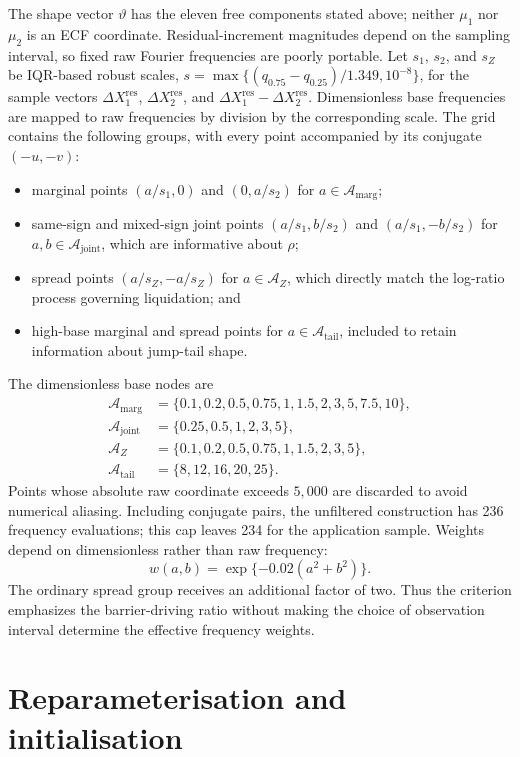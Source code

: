 \documentclass[11pt]{article}
\begin{document}
The shape vector $\vartheta$ has the eleven free components stated above; neither
$\mu_1$ nor $\mu_2$ is an ECF coordinate.
Residual-increment magnitudes depend on the sampling interval, so fixed raw Fourier frequencies
are poorly portable. Let $s_1$, $s_2$, and $s_Z$ be IQR-based robust scales,
$s=\max\{(q_{0.75}-q_{0.25})/1.349,10^{-8}\}$, for the sample vectors
$\Delta X_1^{\mathrm{res}}$, $\Delta X_2^{\mathrm{res}}$, and
$\Delta X_1^{\mathrm{res}}-\Delta X_2^{\mathrm{res}}$. Dimensionless base
frequencies are mapped to raw frequencies by division by the corresponding scale. The
grid contains the following groups, with every point accompanied by its conjugate
$(-u,-v)$:
\begin{itemize}
  \item marginal points $(a/s_1,0)$ and $(0,a/s_2)$ for
    $a\in\mathcal{A}_{\mathrm{marg}}$;
  \item same-sign and mixed-sign joint points
    $(a/s_1,b/s_2)$ and $(a/s_1,-b/s_2)$ for
    $a,b\in\mathcal{A}_{\mathrm{joint}}$, which are informative about $\rho$;
  \item spread points $(a/s_Z,-a/s_Z)$ for $a\in\mathcal{A}_Z$, which directly
    match the log-ratio process governing liquidation; and
  \item high-base marginal and spread points for $a\in\mathcal{A}_{\mathrm{tail}}$,
    included to retain information about jump-tail shape.
\end{itemize}
The dimensionless base nodes are
\begin{align*}
\mathcal{A}_{\mathrm{marg}}&=\{0.1,0.2,0.5,0.75,1,1.5,2,3,5,7.5,10\},\\
\mathcal{A}_{\mathrm{joint}}&=\{0.25,0.5,1,2,3,5\},\\
\mathcal{A}_{Z}&=\{0.1,0.2,0.5,0.75,1,1.5,2,3,5\},\\
\mathcal{A}_{\mathrm{tail}}&=\{8,12,16,20,25\}.
\end{align*}
Points whose absolute raw coordinate exceeds $5{,}000$ are discarded to avoid numerical
aliasing. Including conjugate pairs, the unfiltered construction has 236 frequency
evaluations; this cap leaves 234 for the application sample. Weights depend on dimensionless
rather than raw frequency:
\[
w(a,b)=\exp\{-0.02(a^2+b^2)\}.
\]
The ordinary spread group receives an additional factor of two. Thus the criterion
emphasizes the barrier-driving ratio without making the choice of observation interval
determine the effective frequency weights.

\section{Reparameterisation and initialisation}\label{sec:ecf-init}
\end{document}
